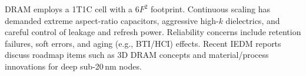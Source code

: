 
\noindent
DRAM employs a 1T1C cell with a 6$F^2$ footprint. Continuous scaling has demanded extreme aspect-ratio capacitors, aggressive high-$k$ dielectrics, and careful control of leakage and refresh power. Reliability concerns include retention failures, soft errors, and aging (e.g., BTI/HCI) effects. Recent IEDM reports discuss roadmap items such as 3D DRAM concepts and material/process innovations for deep sub-20\,nm nodes.
